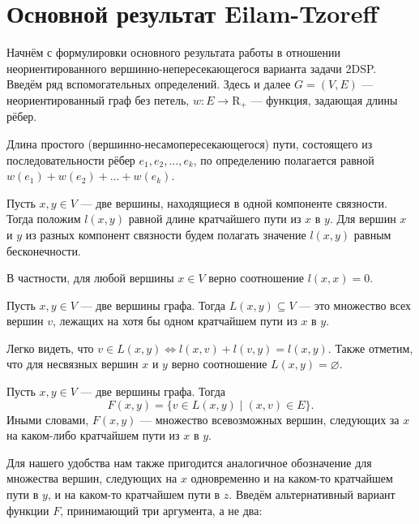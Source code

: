 \chapter{Основной результат Eilam-Tzoreff}

Начнём с формулировки основного результата работы \cite{ET} в отношении неориентированного вершинно-непересекающегося варианта задачи 2DSP. Введём ряд вспомогательных определений. Здесь и далее $G = (V, E)$ --- неориентированный граф без петель, $w : E \rightarrow \mathrm{R}_+$ --- функция, задающая длины рёбер. 

\begin{definition}
Длина простого (вершинно-несамопересекающегося) пути, состоящего из последовательности рёбер $e_1, e_2, \ldots, e_k$, по определению полагается равной $w(e_1) + w(e_2) + \ldots + w(e_k)$.
\end{definition}

\begin{definition} 
Пусть $x, y \in V$ --- две вершины, находящиеся в одной компоненте связности. Тогда положим $l(x, y)$ равной длине кратчайшего пути из $x$ в $y$. Для вершин $x$ и $y$ из разных компонент связности будем полагать значение $l(x, y)$ равным бесконечности.
\end{definition}

В частности, для любой вершины $x \in V$ верно соотношение $l(x, x) = 0$.

\begin{definition} \label{is_between}
Пусть $x, y \in V$ --- две вершины графа. Тогда $L(x, y) \subseteq V$ --- это множество всех вершин $v$, лежащих на хотя бы одном кратчайшем пути из $x$ в $y$.
\end{definition}

Легко видеть, что $v \in L(x, y) \Leftrightarrow l(x, v) + l(v, y) = l(x, y)$. Также отметим, что для несвязных вершин $x$ и $y$ верно соотношение $L(x, y) = \varnothing$.

\begin{definition}
Пусть $x, y \in V$ --- две вершины графа. Тогда 
\begin{equation}
F(x, y) = \{v \in L(x, y) \mid (x, v) \in E\}.
\end{equation}
Иными словами, $F(x, y)$ --- множество всевозможных вершин, следующих за $x$ на каком-либо кратчайшем пути из $x$ в $y$. 
\end{definition}

Для нашего удобства нам также пригодится аналогичное обозначение для множества вершин, следующих на $x$ одновременно и на каком-то кратчайшем пути в $y$, и на каком-то кратчайшем пути в $z$. Введём альтернативный вариант функции $F$, принимающий три аргумента, а не два:

